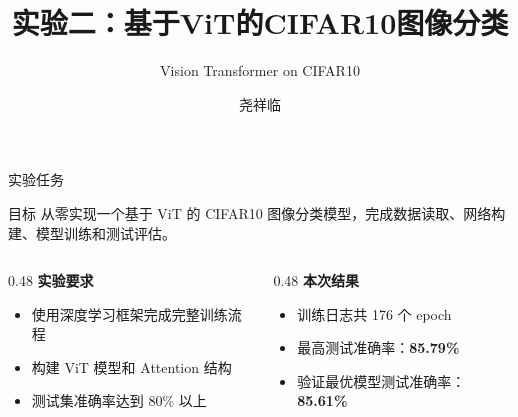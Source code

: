 \documentclass[aspectratio=169,10pt]{ctexbeamer}
\title{实验二：基于ViT的CIFAR10图像分类}
\subtitle{Vision Transformer on CIFAR10}
\author{尧祥临 \quad 202518023406038}
\institute{中国科学院大学 \quad 前沿交叉科学学院\\2026年春季学期\quad 深度学习}
\date{}
\begin{document}
\begin{frame}
	\titlepage
\end{frame}

\begin{frame}{实验任务}
	\begin{block}{目标}
		从零实现一个基于 ViT 的 CIFAR10 图像分类模型，完成数据读取、网络构建、模型训练和测试评估。
	\end{block}

	\begin{columns}[T,onlytextwidth]
		\begin{column}{0.48\textwidth}
			\textbf{实验要求}
			\begin{itemize}
				\item 使用深度学习框架完成完整训练流程
				\item 构建 ViT 模型和 Attention 结构
				\item 测试集准确率达到 80\% 以上
			\end{itemize}
		\end{column}
		\begin{column}{0.48\textwidth}
			\textbf{本次结果}
			\begin{itemize}
				\item 训练日志共 176 个 epoch
				\item 最高测试准确率：\textbf{85.79\%}
				\item 验证最优模型测试准确率：\textbf{85.61\%}
			\end{itemize}
		\end{column}
	\end{columns}
\end{frame}
\end{document}

